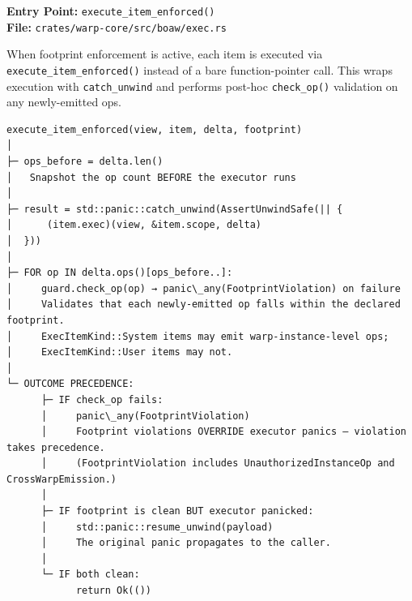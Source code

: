 \documentclass[11pt]{book}
\begin{document}
\textbf{Entry Point:} \texttt{execute\_item\_enforced()} \\
\textbf{File:} \texttt{crates/warp-core/src/boaw/exec.rs}

When footprint enforcement is active, each item is executed via
\texttt{execute\_item\_enforced()} instead of a bare function-pointer call.
This wraps execution with \texttt{catch\_unwind} and performs post-hoc
\texttt{check\_op()} validation on any newly-emitted ops.

\begin{verbatim}
execute_item_enforced(view, item, delta, footprint)
│
├─ ops_before = delta.len()
│   Snapshot the op count BEFORE the executor runs
│
├─ result = std::panic::catch_unwind(AssertUnwindSafe(|| {
│      (item.exec)(view, &item.scope, delta)
│  }))
│
├─ FOR op IN delta.ops()[ops_before..]:
│     guard.check_op(op) → panic\_any(FootprintViolation) on failure
│     Validates that each newly-emitted op falls within the declared footprint.
│     ExecItemKind::System items may emit warp-instance-level ops;
│     ExecItemKind::User items may not.
│
└─ OUTCOME PRECEDENCE:
      ├─ IF check_op fails:
      │     panic\_any(FootprintViolation)
      │     Footprint violations OVERRIDE executor panics — violation takes precedence.
      │     (FootprintViolation includes UnauthorizedInstanceOp and CrossWarpEmission.)
      │
      ├─ IF footprint is clean BUT executor panicked:
      │     std::panic::resume_unwind(payload)
      │     The original panic propagates to the caller.
      │
      └─ IF both clean:
            return Ok(())
\end{verbatim}
\end{document}
